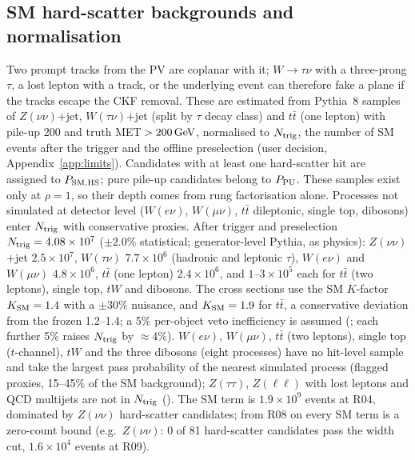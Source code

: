 \subsection{SM hard-scatter backgrounds and normalisation}\label{sec:bkg:sm}
Two prompt tracks from the PV are coplanar with it; $W\to\tau\nu$ with a three-prong $\tau$, a lost lepton with a track,
or the underlying event can therefore fake a plane if the tracks escape the CKF removal. These are estimated from
Pythia~8 samples of $Z(\nu\nu)$+jet, $W(\tau\nu)$+jet (split by $\tau$ decay class) and $t\bar t$ (one lepton) with
pile-up 200 and truth MET$\,>200\,\mathrm{GeV}$, normalised to $N_{\rm trig}$, the number of SM events after the trigger and the offline
preselection (user decision, Appendix~\ref{app:limits}). Candidates with at least one hard-scatter hit are assigned to $P_{\rm SM,HS}$; pure
pile-up candidates belong to $P_{\rm PU}$. These samples exist only at $\rho=1$, so their depth comes from rung
factorisation alone. Processes not simulated at detector level ($W(e\nu)$, $W(\mu\nu)$, $t\bar t$ dileptonic, single top, dibosons) enter
$N_{\rm trig}$ with conservative proxies.
After trigger and preselection $N_{\rm trig}=4.08\times10^7$ ($\pm2.0\%$ statistical; generator-level Pythia, \EST{} as
physics): $Z(\nu\nu)$+jet $2.5\times10^7$, $W(\tau\nu)$ $7.7\times10^6$ (hadronic and leptonic $\tau$), $W(e\nu)$ and
$W(\mu\nu)$ $4.8\times10^6$, $t\bar t$ (one lepton) $2.4\times10^6$, and $1$--$3\times10^5$ each for $t\bar t$ (two leptons),
single top, $tW$ and dibosons. The cross sections use the SM $K$-factor $K_{\rm SM}=1.4$ with a $\pm30\%$ nuisance, and $K_{\rm SM}=1.9$ for $t\bar t$, a
conservative deviation from the frozen 1.2--1.4; a 5\% per-object veto inefficiency is assumed (\EST{}; each further 5\%
raises $N_{\rm trig}$ by $\approx4\%$). $W(e\nu)$, $W(\mu\nu)$, $t\bar t$ (two leptons), single top ($t$-channel), $tW$ and the three dibosons (eight processes) have no
hit-level sample and take the largest pass probability of the nearest simulated process (flagged proxies, 15--45\% of the
SM background); $Z(\tau\tau)$, $Z(\ell\ell)$ with lost leptons and QCD multijets are not in $N_{\rm trig}$ (\UNV{}). The SM term
is $1.9\times10^9$ events at R04, dominated by $Z(\nu\nu)$ hard-scatter candidates; from R08 on every SM term is a
zero-count bound (e.g.\ $Z(\nu\nu)$: 0 of 81 hard-scatter candidates pass the width cut, $1.6\times10^4$ events at R09).

